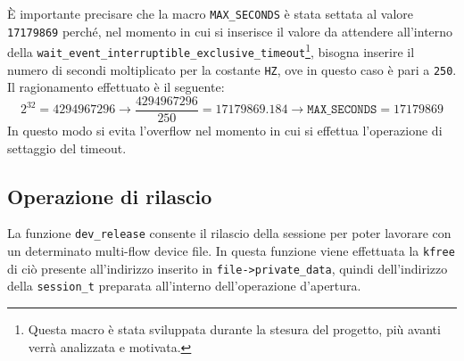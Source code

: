 \documentclass[oneside]{article}
\begin{document}
È importante precisare che la macro \texttt{MAX\_SECONDS} è stata settata al valore \texttt{17179869} perché, nel momento in cui si inserisce il valore da attendere all'interno della \texttt{wait\_event\_interruptible\_exclusive\_timeout}\footnote{Questa macro è stata sviluppata durante la stesura del progetto, più avanti verrà analizzata e motivata.}, bisogna inserire il numero di secondi moltiplicato per la costante \texttt{HZ}, ove in questo caso è pari a \texttt{250}. Il ragionamento effettuato è il seguente:
\begin{equation*}
2^{32} = 4294967296 \rightarrow \frac{4294967296}{250} = 17179869.184 \rightarrow \mathtt{MAX\_SECONDS} = 17179869
\end{equation*}
In questo modo si evita l'overflow nel momento in cui si effettua l'operazione di settaggio del timeout.

\subsection{Operazione di rilascio}
La funzione \texttt{dev\_release} consente il rilascio della sessione per poter lavorare con un determinato multi-flow device file. In questa funzione viene effettuata la \texttt{kfree} di ciò presente all'indirizzo inserito in \texttt{file->private\_data}, quindi dell'indirizzo della \texttt{session\_t} preparata all'interno dell'operazione d'apertura.
\end{document}
